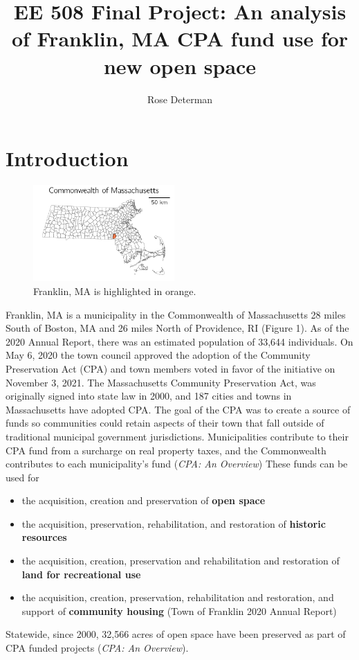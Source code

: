 \documentclass[12pt, stu, floatsintext,table]{apa7}
\title{EE 508 Final Project: An analysis of Franklin, MA CPA fund use for new open space}
\author{Rose Determan}
\affiliation{ }
\begin{document}
\maketitle
\section{Introduction}
\begin{figure}
  \begin{center}
    \includegraphics[width=0.48\textwidth]{figures/state.png}
  \end{center}
  \caption{Franklin, MA is highlighted in orange.}
\end{figure}

Franklin, MA is a municipality in the Commonwealth of Massachusetts 28 miles South of Boston, MA and 26 miles North of Providence, RI (Figure 1). As of the 2020 Annual Report, there was an estimated population of 33,644 individuals. 
On May 6, 2020 the town council approved the adoption of the Community Preservation Act (CPA) and town members voted in favor of the initiative on November 3, 2021. The Massachusetts Community Preservation Act, was originally signed into state law in 2000, and 187 cities and towns in Massachusetts have adopted CPA. The goal of the CPA was to create a source of funds so communities could retain aspects of their town that fall outside of traditional municipal government jurisdictions. Municipalities contribute to their CPA fund from a surcharge on real property taxes, and the Commonwealth contributes to each municipality's fund (\emph{CPA: An Overview}) These funds can be used for
\begin{itemize}
  \setlength\itemsep{0.0em}
  \item the acquisition, creation and preservation of \textbf{open space}
  \item the acquisition, preservation, rehabilitation, and restoration of \textbf{historic resources}
  \item the acquisition, creation, preservation and rehabilitation and restoration of \textbf{land for recreational use}
  \item the acquisition, creation, preservation, rehabilitation and restoration, and support of \textbf{community housing} (Town of Franklin 2020 Annual Report)
\end{itemize}
Statewide, since 2000, 32,566 acres of open space have been preserved as part of CPA funded projects (\emph{CPA: An Overview}).    
\end{document}
